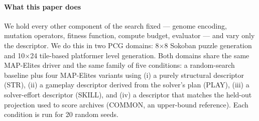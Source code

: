 \documentclass[conference]{IEEEtran}
\begin{document}
\paragraph{What this paper does} We hold every other component of the
search fixed --- genome encoding, mutation operators, fitness
function, compute budget, evaluator --- and vary only the
descriptor. We do this in two PCG domains: 8$\times$8 Sokoban puzzle
generation and 10$\times$24 tile-based platformer level generation.
Both domains share the same MAP-Elites driver and the same family of
five conditions: a random-search baseline plus four MAP-Elites
variants using (i) a purely structural descriptor (\textsf{STR}),
(ii) a gameplay descriptor derived from the solver's plan
(\textsf{PLAY}), (iii) a solver-effort descriptor (\textsf{SKILL}),
and (iv) a descriptor that matches the held-out projection used to
score archives (\textsf{COMMON}, an upper-bound reference). Each
condition is run for 20 random seeds.
\end{document}

